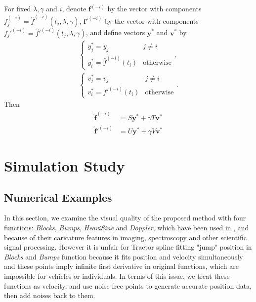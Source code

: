\begin{lemma} \label{cvlemma}
For fixed $\lambda,\gamma$ and $i$, denote $\mathbf{f}^{(-i)}$ by the vector with components $f_j^{(-i)}=\hat{f}^{(-i)}(t_j,\lambda,\gamma)$,  $\mathbf{f}'^{(-i)}$ by the vector with components $f_j'^{(-i)}=\hat{f}'^{(-i)}(t_j,\lambda,\gamma)$, and define vectors $\mathbf{y}^*$ and $\mathbf{v}^*$ by 
\begin{align}
\begin{cases}
y_j^*=y_j &j \neq i\\
y_i^*=\hat{f}^{(-i)}(t_i) &\mbox{otherwise}
\end{cases},\\
\begin{cases}
v_j^*=v_j &j \neq i\\
v_i^*=\hat{f}'^{(-i)}(t_i) &\mbox{otherwise}
\end{cases}.
\end{align}
Then
\begin{align}
\mathbf{\hat{f}}^{(-i)}&=S\mathbf{y}^*+\gamma T\mathbf{v}^*\\
\mathbf{\hat{f}}'^{(-i)}&=U\mathbf{y}^*+\gamma V\mathbf{v}^*
\end{align}
\end{lemma}


\section{Simulation Study} %


\subsection{Numerical Examples}

In this section, we examine the visual quality of the proposed method with four functions: \textit{Blocks}, \textit{Bumps}, \textit{HeaviSine} and \textit{Doppler}, which have been used in \cite{donoho1994ideal}, \cite{donoho1995adapting} and \cite{abramovich1998wavelet} because of their caricature features in imaging, spectroscopy and other scientific signal processing. However it is unfair for Tractor spline fitting "jump" position in \textit{Blocks} and \textit{Bumps} function because it fits position and velocity simultaneously and these points imply infinite first derivative in original functions, which are impossible for vehicles or individuals. In terms of this issue, we treat these functions as velocity, and use noise free points to generate accurate position data, then add noises back to them.

